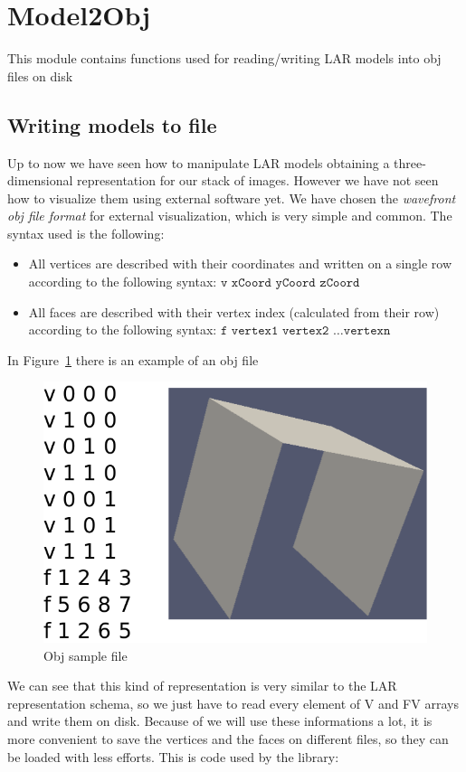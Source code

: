 \documentclass[11pt,oneside]{article}	%
\begin{document}
\section{Model2Obj}\label{sec:Model2Obj}

This module contains functions used for reading/writing LAR models into obj files on disk

\subsection{Writing models to file}\label{sec:writeObj}

Up to now we have seen how to manipulate LAR models obtaining a three-dimensional representation for our stack of images. However we have not seen how to visualize them using external software yet. We have chosen the \textit{wavefront obj file format} for external visualization, which is very simple and common. The syntax used is the following:
\begin{itemize}
 \item All vertices are described with their coordinates and written on a single row according to the following syntax: $\texttt{v xCoord yCoord zCoord}$
 \item All faces are described with their vertex index (calculated from their row) according to the following syntax: $\texttt{f vertex1 vertex2 \ldots vertexn}$
\end{itemize}

In Figure~\ref{fig:objSample} there is an example of an obj file

\begin{figure}[htb] %
   \centering
   \includegraphics[width=0.40\linewidth]{images/objSample.png}
   \caption{Obj sample file}
   \label{fig:objSample}
\end{figure}

We can see that this kind of representation is very similar to the LAR representation schema, so we just have to read every element of V and FV arrays and write them on disk. Because of we will use these informations a lot, it is more convenient to save the vertices and the faces on different files, so they can be loaded with less efforts. This is code used by the library:
\end{document}

